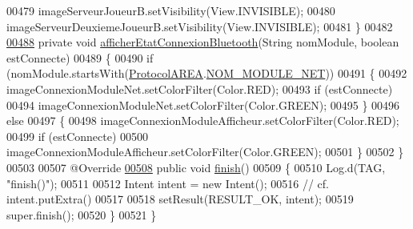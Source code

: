 \begin{DoxyCode}
00479         imageServeurJoueurB.setVisibility(View.INVISIBLE);
00480         imageServeurDeuxiemeJoueurB.setVisibility(View.INVISIBLE);
00481     \}
00482 
\hyperlink{classcom_1_1example_1_1area_1_1_i_h_m_gestion_partie_a73fa6d212cf9c5e4dc8fadc96d8d35e9}{00488}     \textcolor{keyword}{private} \textcolor{keywordtype}{void} \hyperlink{classcom_1_1example_1_1area_1_1_i_h_m_gestion_partie_a73fa6d212cf9c5e4dc8fadc96d8d35e9}{afficherEtatConnexionBluetooth}(String nomModule, \textcolor{keywordtype}{boolean} 
      estConnecte)
00489     \{
00490         \textcolor{keywordflow}{if} (nomModule.startsWith(\hyperlink{classcom_1_1example_1_1area_1_1_protocol_a_r_e_a}{ProtocolAREA}.\hyperlink{classcom_1_1example_1_1area_1_1_protocol_a_r_e_a_a77e082eb863a4839d0f1e885b31594e2}{NOM\_MODULE\_NET}))
00491         \{
00492             imageConnexionModuleNet.setColorFilter(Color.RED);
00493             \textcolor{keywordflow}{if} (estConnecte)
00494                 imageConnexionModuleNet.setColorFilter(Color.GREEN);
00495         \}
00496         \textcolor{keywordflow}{else}
00497         \{
00498             imageConnexionModuleAfficheur.setColorFilter(Color.RED);
00499             \textcolor{keywordflow}{if} (estConnecte)
00500                 imageConnexionModuleAfficheur.setColorFilter(Color.GREEN);
00501         \}
00502     \}
00503 
00507     @Override
\hyperlink{classcom_1_1example_1_1area_1_1_i_h_m_gestion_partie_aafa9ce81364dbd851409ae0b38138e28}{00508}     \textcolor{keyword}{public} \textcolor{keywordtype}{void} \hyperlink{classcom_1_1example_1_1area_1_1_i_h_m_gestion_partie_aafa9ce81364dbd851409ae0b38138e28}{finish}()
00509     \{
00510         Log.d(TAG, \textcolor{stringliteral}{"finish()"});
00511 
00512         Intent intent = \textcolor{keyword}{new} Intent();
00516         \textcolor{comment}{// cf. intent.putExtra()}
00517 
00518         setResult(RESULT\_OK, intent);
00519         super.finish();
00520     \}
00521 \}
\end{DoxyCode}
